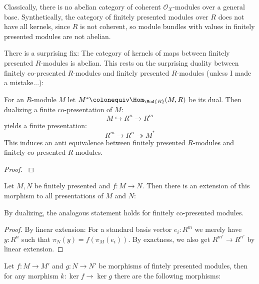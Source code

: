 
Classically, there is no abelian category of coherent $\mathcal O_X$-modules over a general base.
Synthetically, the category of finitely presented modules over $R$ does not have all kernels,
since $R$ is not coherent, so module bundles with values in finitely presented modules are not abelian.

There is a surprising fix: The category of kernels of maps between finitely presented $R$-modules is abelian.
This rests on the surprising duality between finitely co-presented $R$-modules and finitely presented $R$-modules (unless I made a mistake...):

\begin{theorem}
  For an $R$-module $M$ let $M^\ast\colonequiv \Hom_{\Mod{R}}(M,R)$ be its dual.
  Then dualizing a finite co-presentation of $M$:
  \[ M \hookrightarrow R^n \to R^m \]
  yields a finite presentation:
  \[ R^m \to R^n \twoheadrightarrow M^\ast \]
  This induces an anti equivalence between finitely presented $R$-modules and finitely co-presented $R$-modules.
\end{theorem}

\begin{proof}
  \cite{etale-draft}
\end{proof}

\begin{lemma}
  \label{presentation-extension}
  Let $M,N$ be finitely presented and $f:M\to N$.
  Then there is an extension of this morphism to all presentations of $M$ and $N$:
  \begin{center}
  \end{center}
  By dualizing, the analogous statement holds for finitely co-presented modules.
\end{lemma}

\begin{proof}
  By linear extension: For a standard basis vector $e_i:R^m$ we merely have $y:R^n$ such that $\pi_N(y)=f(\pi_M(e_i))$. By exactness, we also get $R^{m'}\to R^{n'}$ by linear extension.
\end{proof}

\begin{lemma}
  Let $f:M\to M'$ and $g:N\to N'$ be morphisms of fintely presented modules, then for any morphism
  $k:\ker{f}\to \ker{g}$ there are the following morphisms:
  \begin{center}
  \end{center}
\end{lemma}

